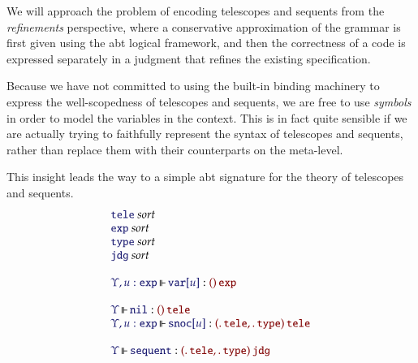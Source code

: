 \documentclass[11pt]{article}
\theoremstyle{definition}
\theoremstyle{remark}
\numberwithin{equation}{section}
\begin{document}
We will approach the problem of encoding telescopes and sequents from the
\emph{refinements} perspective, where a conservative approximation of the
grammar is first given using the abt logical framework, and then the correctness
of a code is expressed separately in a judgment that refines the existing
specification.

Because we have not committed to using the built-in binding machinery to express
the well-scopedness of telescopes and sequents, we are free to use
\emph{symbols} in order to model the variables in the context. This is in fact
quite sensible if we are actually trying to faithfully represent the syntax of
telescopes and sequents, rather than replace them with their counterparts on the
meta-level.

This insight leads the way to a simple abt signature for the theory of
telescopes and sequents.
%
\newcommand\SortTele{\mathtt{tele}}
\newcommand\SortJdg{\mathtt{jdg}}
\newcommand\SortType{\mathtt{type}}
\newcommand\SortExpr{\mathtt{exp}}
\newcommand\OpNil{\mathtt{nil}}
\newcommand\OpSnoc[1]{\mathtt{snoc}[#1]}
\newcommand\OpVar[1]{\mathtt{var}[#1]}
\newcommand\OpSequent{\mathtt{sequent}}
\[
  \begin{array}{l}
    \IsSort{\SortTele}\\
    \IsSort{\SortExpr}\\
    \IsSort{\SortType}\\
    \IsSort{\SortJdg}\\\\
    \IsOperator{\Upsilon, u:\SortExpr}{\OpVar{u}}{
      \MkArity{}{\SortExpr}
    }\\\\
    \IsOperator{\Upsilon}{\OpNil}{
      \MkArity{}{\SortTele}
    }\\
    \IsOperator{\Upsilon, u:\SortExpr}{\OpSnoc{u}}{
      \MkArity{
        \MkValence{}{}{\SortTele},
        \MkValence{}{}{\SortType}
      }{\SortTele}
    }\\\\
    \IsOperator{\Upsilon}{\OpSequent}{
      \MkArity{
        \MkValence{}{}{\SortTele},
        \MkValence{}{}{\SortType}
      }{\SortJdg}
    }
  \end{array}
\]

\newcommand\OpPi{\mathtt{pi}}
\newcommand\OpSg{\mathtt{sg}}
\newcommand\OpBool{\mathtt{bool}}
\newcommand\OpSo{\mathtt{isTrue}}
\end{document}

